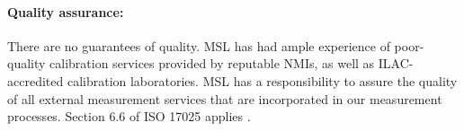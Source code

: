 {\paragraph{Quality assurance:}
There are no guarantees of quality. MSL has had ample experience of poor-quality calibration services provided by reputable NMIs, as well as ILAC-accredited calibration laboratories. MSL has a responsibility to assure the quality of all external measurement services that are incorporated in our measurement processes. Section 6.6 of ISO 17025 applies \cite{ISO_17025}.
 

}

